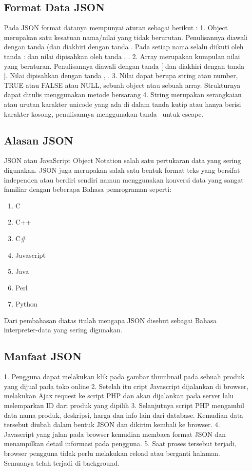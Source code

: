 \documentclass[a4paper]{article}
\begin{document}
\subsection{Format Data JSON}
Pada JSON format datanya mempunyai aturan sebagai berikut :
1. Object merupakan satu kesatuan nama/nilai yang tidak berurutan. Penulisannya diawali dengan tanda { (dan diakhiri dengan tanda } .
Pada setiap nama selalu diikuti oleh tanda : dan nilai dipisahkan oleh tanda , .
2.  Array merupakan kumpulan nilai yang beraturan. Penulisannya diawali dengan tanda [ dan diakhiri dengan tanda ]. Nilai dipisahkan dengan tanda , .
3. Nilai dapat berupa string atau number, TRUE atau FALSE atau NULL, sebuah object atau sebuah array. Strukturnya dapat ditulis menggunakan metode bersarang
4. String merupakan serangkaian atau urutan karakter unicode yang ada di dalam tanda kutip atau hanya berisi karakter kosong, penulisannya menggunakan tanda \  untuk escape.

\subsection{Alasan JSON}
JSON atau JavaScript Object Notation salah satu pertukaran data yang sering digunakan. JSON juga merupakan salah satu bentuk format teks yang bersifat independen atau berdiri sendiri namun menggunakan konversi data yang sangat familiar dengan beberapa Bahasa pemrograman seperti:

\begin{enumerate}
\item C
\item C++
\item C\#
\item Javascript
\item Java
\item Perl
\item Python

\end{enumerate}
Dari pembahasan diatas itulah mengapa JSON disebut sebagai Bahasa interpreter-data yang sering digunakan.
\subsection{Manfaat JSON}
1.	Pengguna dapat melakukan klik pada gambar thumbnail pada sebuah produk yang dijual pada toko online
2.	Setelah itu cript Javascript dijalankan di browser, melakukan Ajax request ke script PHP dan akan dijalankan pada server lalu melemparkan ID dari produk yang dipilih
3.	Selanjutnya script PHP mengambil data nama produk, deskripsi, harga dan info lain dari database. Kemudian data tersebut diubah dalam bentuk JSON dan dikirim kembali ke browser.
4.	Javascript yang jalan pada browser kemudian membaca format JSON dan menampilkan detail informasi pada pengguna.
5.	Saat proses tersebut terjadi, browser pengguna tidak perlu melakukan reload atau berganti halaman. Semuanya telah terjadi di background.
\end{document}
